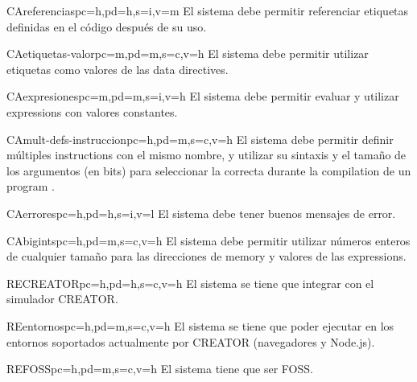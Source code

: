 \begin{userReq}{CA}{referencias}{pc=h,pd=h,s=i,v=m}
    El sistema debe permitir referenciar etiquetas definidas en el
    código  después de su uso.
\end{userReq}

\begin{userReq}{CA}{etiquetas-valor}{pc=m,pd=m,s=c,v=h}
    El sistema debe permitir utilizar etiquetas como valores de las \glspl{data directive}.
\end{userReq}

\begin{userReq}{CA}{expresiones}{pc=m,pd=m,s=i,v=h}
    El sistema debe permitir evaluar y utilizar \glspl{expression} con valores
    constantes.
\end{userReq}

\begin{userReq}{CA}{mult-defs-instruccion}{pc=h,pd=m,s=c,v=h}
    El sistema debe permitir definir múltiples \glspl{instruction} con el mismo
    nombre, y utilizar su sintaxis y el tamaño de los argumentos (en bits) para
    seleccionar la correcta durante la \gls{compilation} de un \gls{program}
    .
\end{userReq}

\begin{userReq}{CA}{errores}{pc=h,pd=h,s=i,v=l}
    El sistema debe tener buenos mensajes de error.
\end{userReq}

\begin{userReq}{CA}{bigints}{pc=h,pd=m,s=c,v=h}
    El sistema debe permitir utilizar números enteros de cualquier tamaño para
    las direcciones de \gls{memory} y valores de las \glspl{expression}.
\end{userReq}


\begin{userReq}{RE}{CREATOR}{pc=h,pd=h,s=c,v=h}
    El sistema se tiene que integrar con el simulador CREATOR.
\end{userReq}

\begin{userReq}{RE}{entornos}{pc=h,pd=m,s=c,v=h}
    El sistema se tiene que poder ejecutar en los entornos soportados
    actualmente por CREATOR (navegadores y Node.js).
\end{userReq}

\begin{userReq}{RE}{FOSS}{pc=h,pd=m,s=c,v=h}
    El sistema tiene que ser \gls{FOSS}.
\end{userReq}

